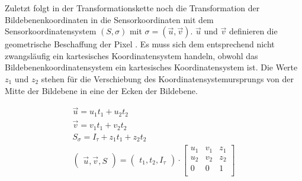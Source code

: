 		
	 Zuletzt folgt in der Transformationskette noch die Transformation der Bildebenenkoordinaten in die Sensorkoordinaten mit dem Sensorkoordinatensystem $(S,\sigma)$ mit $\sigma = (\vec{u},\vec{v})$. $\vec{u}$ und $\vec{v}$ definieren die geometrische Beschaffung der Pixel . Es muss sich dem entsprechend nicht zwangsläufig ein kartesisches Koordinatensystem handeln, obwohl das Bildebenenkoordinatensystem ein kartesisches Koordinatensystem ist. Die Werte $z_1$ und $z_2$ stehen für die Verschiebung des Koordinatensystemursprungs von der Mitte der Bildebene in eine der Ecken der Bildebene.
		
		\begin{gather}
		\vec{u} = u_1 t_1 + u_2 t_2\\
		\vec{v} = v_1 t_1 + v_2 t_2\\
		S_\sigma = I_\tau +z_1 t_1 + z_2 t_2\\
		\begin{pmatrix}
		\vec{u}, \vec{v}, S
		\end{pmatrix}		
		=
		\begin{pmatrix}
		t_1, t_2, I_\tau
		\end{pmatrix}\cdot	
		\begin{bmatrix}
		u_1&v_1&z_1\\u_2&v_2&z_2\\0&0&1\\
		\end{bmatrix}
		\end{gather}
		
